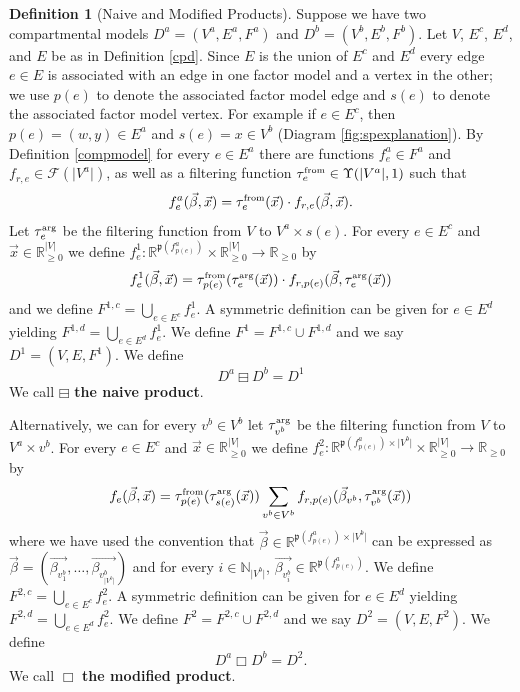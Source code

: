 \documentclass{article}
\theoremstyle{definition}
\newtheorem{definition}{Definition}
\newcommand{\Nset}[1]{\mathbb{N}_{#1}}%
\newcommand{\R}{\mathbb{R}}%
\newcommand{\Rnn}{\mathbb{R}_{\ge 0}}%
\newcommand{\abs}[1]{\lvert #1 \rvert}%
\newcommand{\pardim}[1]{\mathfrak{p}(#1)}%
\newcommand{\betavec}{\vec{\beta}}
\newcommand{\xvec}{\vec{x}}
\newcommand{\fr}{\ensuremath{\mathcal F}}
\newcommand{\tauf}{\tau^{\mbox{\tiny from}}}
\newcommand{\taua}{\tau^{\mbox{\tiny arg}}}
\begin{document}
\begin{definition}[Naive and Modified Products]\label{products}
 Suppose we have two compartmental models $D^a = (V^a, E^a, F^a)$ and $D^b = (V^b, E^b, F^b)$. Let $V$, $E^c$, $E^d$, and $E$ be as in Definition \ref{cpd}. Since $E$ is the union of $E^c$ and $E^d$ every edge $e\in E$ is associated with an edge in one factor model and a vertex in the other; we use $p(e)$ to denote the associated factor model edge and $s(e)$ to denote the associated factor model vertex. For example if $e\in E^c$, then $p(e) = (w,y)\in E^a$ and $s(e) = x \in V^b$ (Diagram \ref{fig:spexplanation}). By Definition \ref{compmodel} for every $e\in E^a$ there are functions $f^a_{e}\in F^a$ and $f_{r,e}\in \fr(\abs{V^a})$, as well as a filtering function $\tauf_{e}\in\Upsilon(\abs{V^a}, 1)$ such that
 \begin{equation}
        f^a_{e}(\betavec, \xvec) = \tauf_e(\xvec)\cdot f_{r,e}(\betavec, \xvec).
 \end{equation}
 Let $\taua_e$ be the filtering function from $V$ to $V^a\times s(e)$. For every $e\in E^c$ and $\vec{x}\in\Rnn^{\abs{V}}$ we define $f^1_e:\R^{\pardim{f^a_{p(e)}}}\times\Rnn^{\abs{V}}\rightarrow\Rnn$ by
 \begin{equation}
        f^1_e(\betavec, \xvec) = \tauf_{p(e)}(\taua_e(\xvec))\cdot f_{r,p(e)}(\betavec, \taua_e(\xvec))
 \end{equation}
 and we define $F^{1,c} = \bigcup\limits_{e\in E^c}f^1_e$. A symmetric definition can be given for $e\in E^d$ yielding $F^{1,d} = \bigcup\limits_{e\in E^d}f^1_e$. We define $F^1 = F^{1,c}\cup F^{1,d}$ and we say $D^1 = (V, E, F^1)$. We define
 \begin{equation}
        D^a\boxminus D^b = D^1
 \end{equation} We call $\boxminus$ \textbf{the naive product}.

 Alternatively, we can for every $v^b\in V^b$ let $\taua_{v^b}$ be the filtering function from $V$ to $V^a\times v^b$. For every $e\in E^c$ and $\vec{x}\in\Rnn^{\abs{V}}$ we define $f^2_e:\R^{\pardim{f^a_{p(e)}}\times \abs{V^b}}\times\Rnn^{\abs{V}}\rightarrow\Rnn$ by
 \begin{equation}\label{modified_eq}
    f_e(\vec{\beta}, \vec{x}) = \tauf_{p(e)}(\taua_{s(e)}(\xvec))\sum\limits_{v^b\in V^b} f_{r,p(e)}(\betavec_{v^b},\taua_{v^b}(\xvec))
 \end{equation}
 where we have used the convention that $\vec{\beta}\in\R^{\pardim{f^a_{p(e)}}\times \abs{V^b}}$ can be expressed as $\vec{\beta} = (\vec{\beta_{v^b_1}}, \ldots, \vec{\beta_{v^b_{\abs{V^b}}}})$ and for every $i\in\Nset{\abs{V^b}}$, $\vec{\beta_{v^b_i}}\in \R^{\pardim{f^a_{p(e)}}}$. We define $F^{2,c} = \bigcup\limits_{e\in E^c}f^2_e$. A symmetric definition can be given for $e\in E^d$ yielding $F^{2,d} = \bigcup\limits_{e\in E^d}f^2_e$. We define $F^2 = F^{2,c}\cup F^{2,d}$ and we say $D^2=(V, E, F^2)$. We define
 \begin{equation}
    D^a\Box D^b = D^2.
 \end{equation} We call $\Box$ \textbf{the modified product}.
\end{definition}
\end{document}
